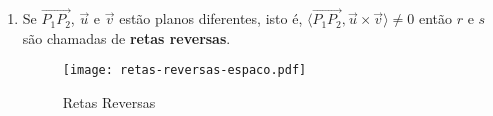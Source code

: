 \begin{enumerate}
\begin{enumerate}
\begin{figure}[h]
\end{figure}
\item Se $\vec{P_1P_2}$, $\vec{u}$ e $\vec{v}$ est\~ao planos diferentes, isto \'e, $\langle\vec{P_1P_2}, \vec{u}\times\vec{v}\rangle \ne 0$ ent\~ao $r$ e $s$ s\~ao chamadas de  \textbf{retas reversas}.
\begin{figure}[h]
   \centering
   \caption{Retas Reversas}
   \texttt{[image: retas-reversas-espaco.pdf]}
\end{figure}
\end{enumerate} 
\end{enumerate}

